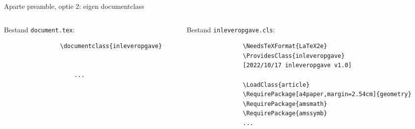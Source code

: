 

%         
%         




\copyrightVincent
\begin{frame}[fragile]{Aparte preamble, optie 2: eigen documentclass}
    \begin{columns}
        \begin{column}{0.5\textwidth}
            \small
            Bestand \texttt{document.tex}:
            \begin{verbatim}
                \documentclass{inleveropgave}
        
                
                    ...
                
            \end{verbatim}
        \end{column}
        \begin{column}{0.5\textwidth}
            \small
            Bestand \texttt{inleveropgave.cls}:
            \begin{verbatim}
                \NeedsTeXFormat{LaTeX2e}
                \ProvidesClass{inleveropgave}
                [2022/10/17 inleveropgave v1.0]

                \LoadClass{article}
                \RequirePackage[a4paper,margin=2.54cm]{geometry}
                \RequirePackage{amsmath}
                \RequirePackage{amssymb}
                ...
            \end{verbatim}
        \end{column}
    \end{columns}
\end{frame}

